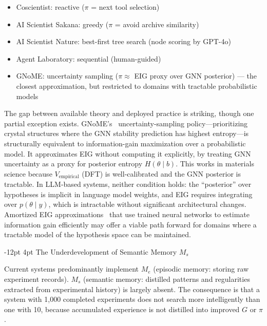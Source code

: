 \documentclass[11pt]{article}
\makeatletter
\renewcommand\subsection{\@startsection{subsection}{2}{\z@}%
  {-12pt \@plus -2pt \@minus -2pt}%
  {4pt \@plus 1pt}%
  {\normalfont\normalsize\bfseries}}
\makeatother
\begin{document}
\begin{itemize}
  \item Coscientist: reactive ($\pi$ = next tool selection)
  \item AI Scientist Sakana: greedy ($\pi$ = avoid archive similarity)
  \item AI Scientist Nature: best-first tree search (node scoring by GPT-4o)
  \item Agent Laboratory: sequential (human-guided)
  \item GNoME: uncertainty sampling ($\pi \approx$ EIG proxy over GNN posterior) --- the closest approximation, but restricted to domains with tractable probabilistic models
\end{itemize}

The gap between available theory and deployed practice is striking, though one partial exception exists. GNoME's~\citep{merchant2023gnome} uncertainty-sampling policy---prioritizing crystal structures where the GNN stability prediction has highest entropy---is structurally equivalent to information-gain maximization over a probabilistic model. It approximates EIG without computing it explicitly, by treating GNN uncertainty as a proxy for posterior entropy $H(\theta \mid b)$. This works in materials science because $V_\text{empirical}$ (DFT) is well-calibrated and the GNN posterior is tractable. In LLM-based systems, neither condition holds: the ``posterior'' over hypotheses is implicit in language model weights, and EIG requires integrating over $p(\theta \mid y)$, which is intractable without significant architectural changes. Amortized EIG approximations~\citep{foster2021dad} that use trained neural networks to estimate information gain efficiently may offer a viable path forward for domains where a tractable model of the hypothesis space can be maintained.

\subsection{The Underdevelopment of Semantic Memory $M_s$}

Current systems predominantly implement $M_e$ (episodic memory: storing raw experiment records). $M_s$ (semantic memory: distilled patterns and regularities extracted from experimental history) is largely absent. The consequence is that a system with 1,000 completed experiments does not search more intelligently than one with 10, because accumulated experience is not distilled into improved $G$ or $\pi$.
\end{document}

